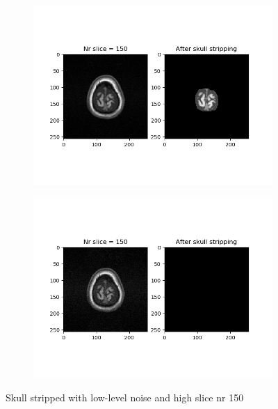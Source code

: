 \begin{figure}[H]
	\centering
	\begin{subfigure}[b]{0.35\linewidth}
		\includegraphics[scale=0.35]{figures/Module_08/M8_16.png}
	\end{subfigure}
		\begin{subfigure}[b]{0.35\linewidth}
		\includegraphics[scale=0.35]{figures/Module_08/M8_n16.png}
	\end{subfigure}
	\caption{Skull stripped with low-level noise and high slice nr 150}
	\label{fig:figures/m08_16}
\end{figure}

